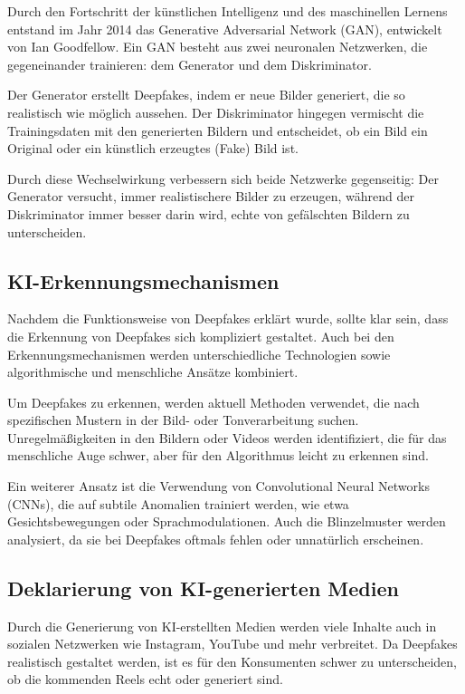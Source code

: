 \documentclass[a4paper,12pt]{article}
\begin{document}
Durch den Fortschritt der künstlichen Intelligenz und des maschinellen Lernens entstand im Jahr 2014 das Generative Adversarial Network (GAN), entwickelt von Ian Goodfellow. Ein GAN besteht aus zwei neuronalen Netzwerken, die gegeneinander trainieren: dem Generator und dem Diskriminator.  

Der Generator erstellt Deepfakes, indem er neue Bilder generiert, die so realistisch wie möglich aussehen. Der Diskriminator hingegen vermischt die Trainingsdaten mit den generierten Bildern und entscheidet, ob ein Bild ein Original oder ein künstlich erzeugtes (Fake) Bild ist.  

Durch diese Wechselwirkung verbessern sich beide Netzwerke gegenseitig: Der Generator versucht, immer realistischere Bilder zu erzeugen, während der Diskriminator immer besser darin wird, echte von gefälschten Bildern zu unterscheiden. \cite{BVDW2024}

\subsection{KI-Erkennungsmechanismen}\label{subsec:KI-Erkennungsmechanismen}
Nachdem die Funktionsweise von Deepfakes erklärt wurde, sollte klar sein, dass die Erkennung von Deepfakes sich kompliziert gestaltet. Auch bei den Erkennungsmechanismen werden unterschiedliche Technologien sowie algorithmische und menschliche Ansätze kombiniert.  

Um Deepfakes zu erkennen, werden aktuell Methoden verwendet, die nach spezifischen Mustern in der Bild- oder Tonverarbeitung suchen. Unregelmäßigkeiten in den Bildern oder Videos werden identifiziert, die für das menschliche Auge schwer, aber für den Algorithmus leicht zu erkennen sind.  

Ein weiterer Ansatz ist die Verwendung von Convolutional Neural Networks (CNNs), die auf subtile Anomalien trainiert werden, wie etwa Gesichtsbewegungen oder Sprachmodulationen. Auch die Blinzelmuster werden analysiert, da sie bei Deepfakes oftmals fehlen oder unnatürlich erscheinen. \cite{BVDW2024}

\subsection{Deklarierung von KI-generierten Medien}
Durch die Generierung von KI-erstellten Medien werden viele Inhalte auch in sozialen Netzwerken wie Instagram, YouTube und mehr verbreitet. Da Deepfakes realistisch gestaltet werden, ist es für den Konsumenten schwer zu unterscheiden, ob die kommenden Reels echt oder generiert sind.  
\end{document}
